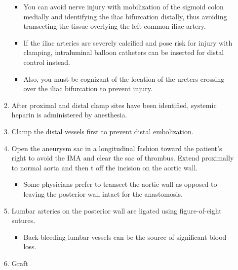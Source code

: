 \documentclass[
]{book}
\providecommand{\tightlist}{%
  \setlength{\itemsep}{0pt}\setlength{\parskip}{0pt}}
\begin{document}
\begin{itemize}
\begin{enumerate}
    \begin{itemize}
    \item
      You can avoid nerve injury with mobilization of the sigmoid
      colon medially and identifying the iliac bifurcation
      distally, thus avoiding transecting the tissue overlying the
      left common iliac artery.
    \item
      If the iliac arteries are severely calcified and pose risk
      for injury with clamping, intraluminal balloon catheters can
      be inserted for distal control instead.
    \item
      Also, you must be cognizant of the location of the ureters
      crossing over the iliac bifurcation to prevent injury.
    \end{itemize}
  \item
    After proximal and distal clamp sites have been identified,
    systemic heparin is administered by anesthesia.
  \item
    Clamp the distal vessels first to prevent distal embolization.
  \item
    Open the aneurysm sac in a longitudinal fashion toward the
    patient's right to avoid the IMA and clear the sac of thrombus.
    Extend proximally to normal aorta and then t off the incision on
    the aortic wall.

    \begin{itemize}
    \tightlist
    \item
      Some physicians prefer to transect the aortic wall as
      opposed to leaving the posterior wall intact for the
      anastomosis.~
    \end{itemize}
  \item
    Lumbar arteries on the posterior wall are ligated using
    figure-of-eight sutures.

    \begin{itemize}
    \tightlist
    \item
      Back-bleeding lumbar vessels can be the source of
      significant blood loss.
    \end{itemize}
  \item
    Graft


\end{enumerate}
\end{itemize}
\end{document}

